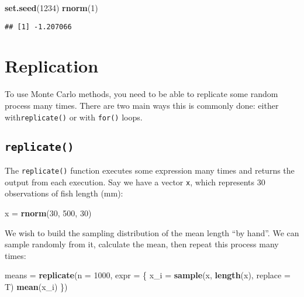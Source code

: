 \documentclass[]{book}
\newenvironment{Shaded}{\begin{snugshade}}{\end{snugshade}}
\newcommand{\DataTypeTok}[1]{\textcolor[rgb]{0.13,0.29,0.53}{#1}}
\newcommand{\DecValTok}[1]{\textcolor[rgb]{0.00,0.00,0.81}{#1}}
\newcommand{\KeywordTok}[1]{\textcolor[rgb]{0.13,0.29,0.53}{\textbf{#1}}}
\newcommand{\NormalTok}[1]{#1}
\newcommand{\StringTok}[1]{\textcolor[rgb]{0.31,0.60,0.02}{#1}}
\begin{document}
\begin{Shaded}
\begin{Highlighting}[]
\KeywordTok{set.seed}\NormalTok{(}\DecValTok{1234}\NormalTok{)}
\KeywordTok{rnorm}\NormalTok{(}\DecValTok{1}\NormalTok{)}
\end{Highlighting}
\end{Shaded}

\begin{verbatim}
## [1] -1.207066
\end{verbatim}

\hypertarget{replication}{%
\section{Replication}\label{replication}}

To use Monte Carlo methods, you need to be able to replicate some random process many times. There are two main ways this is commonly done: either with\texttt{replicate()} or with \texttt{for()} loops.

\hypertarget{replicate}{%
\subsection{\texorpdfstring{\texttt{replicate()}}{replicate()}}\label{replicate}}

The \texttt{replicate()} function executes some expression many times and returns the output from each execution. Say we have a vector \texttt{x}, which represents 30 observations of fish length (mm):

\begin{Shaded}
\begin{Highlighting}[]
\NormalTok{x =}\StringTok{ }\KeywordTok{rnorm}\NormalTok{(}\DecValTok{30}\NormalTok{, }\DecValTok{500}\NormalTok{, }\DecValTok{30}\NormalTok{)}
\end{Highlighting}
\end{Shaded}

We wish to build the sampling distribution of the mean length ``by hand''. We can sample randomly from it, calculate the mean, then repeat this process many times:

\begin{Shaded}
\begin{Highlighting}[]
\NormalTok{means =}\StringTok{ }\KeywordTok{replicate}\NormalTok{(}\DataTypeTok{n =} \DecValTok{1000}\NormalTok{, }\DataTypeTok{expr =}\NormalTok{ \{}
\NormalTok{  x_i =}\StringTok{ }\KeywordTok{sample}\NormalTok{(x, }\KeywordTok{length}\NormalTok{(x), }\DataTypeTok{replace =}\NormalTok{ T)}
  \KeywordTok{mean}\NormalTok{(x_i)}
\NormalTok{\})}
\end{Highlighting}
\end{Shaded}
\end{document}
